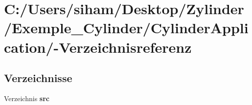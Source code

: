 \section{C:/Users/siham/Desktop/Zylinder/Exemple\_\-Cylinder/Cylinder\-Application/-Verzeichnisreferenz}
\label{dir_C_3A_2FUsers_2Fsiham_2FDesktop_2FZylinder_2FExemple_5FCylinder_2FCylinderApplication_2F}


\subsection*{Verzeichnisse}
\begin{CompactItemize}
\item 
Verzeichnis {\bf src}
\end{CompactItemize}
